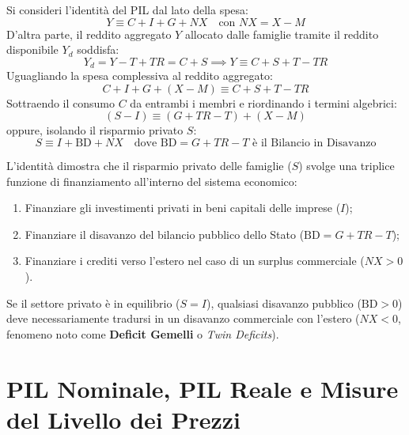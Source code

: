 \begin{dimostrazione}
Si consideri l'identità del PIL dal lato della spesa:
\begin{equation}
    Y \equiv C + I + G + NX \quad \text{con } NX = X - M
\end{equation}
D'altra parte, il reddito aggregato $Y$ allocato dalle famiglie tramite il reddito disponibile $Y_d$ soddisfa:
\begin{equation}
    Y_d = Y - T + TR = C + S \implies Y \equiv C + S + T - TR
\end{equation}
Uguagliando la spesa complessiva al reddito aggregato:
\begin{equation}
    C + I + G + (X - M) \equiv C + S + T - TR
\end{equation}
Sottraendo il consumo $C$ da entrambi i membri e riordinando i termini algebrici:
\begin{equation}
    (S - I) \equiv (G + TR - T) + (X - M)
\end{equation}
oppure, isolando il risparmio privato $S$:
\begin{equation}
    S \equiv I + \mathrm{BD} + NX \quad \text{dove } \mathrm{BD} = G + TR - T \text{ è il Bilancio in Disavanzo}
\end{equation}
\end{dimostrazione}

\begin{osservazione}
L'identità dimostra che il risparmio privato delle famiglie ($S$) svolge una triplice funzione di finanziamento all'interno del sistema economico:
\begin{enumerate}
    \item Finanziare gli investimenti privati in beni capitali delle imprese ($I$);
    \item Finanziare il disavanzo del bilancio pubblico dello Stato ($\mathrm{BD} = G + TR - T$);
    \item Finanziare i crediti verso l'estero nel caso di un surplus commerciale ($NX > 0$).
\end{enumerate}
Se il settore privato è in equilibrio ($S = I$), qualsiasi disavanzo pubblico ($\mathrm{BD} > 0$) deve necessariamente tradursi in un disavanzo commerciale con l'estero ($NX < 0$, fenomeno noto come \textbf{Deficit Gemelli} o \textit{Twin Deficits}).
\end{osservazione}

\section{PIL Nominale, PIL Reale e Misure del Livello dei Prezzi}

